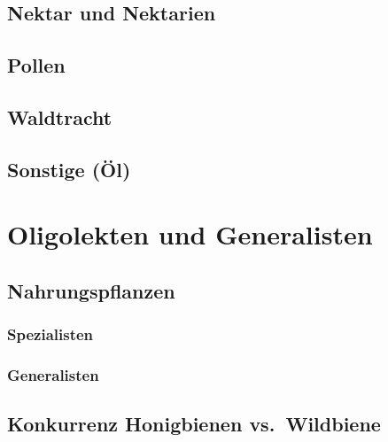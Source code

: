 \documentclass[
]{book}
\begin{document}
\hypertarget{nektar-und-nektarien}{%
\subsection{Nektar und Nektarien}\label{nektar-und-nektarien}}

\hypertarget{pollen}{%
\subsection{Pollen}\label{pollen}}

\hypertarget{waldtracht}{%
\subsection{Waldtracht}\label{waldtracht}}

\hypertarget{sonstige-uxf6l}{%
\subsection{Sonstige (Öl)}\label{sonstige-uxf6l}}

\hypertarget{oligolekten-und-generalisten}{%
\section{Oligolekten und Generalisten}\label{oligolekten-und-generalisten}}

\hypertarget{nahrungspflanzen}{%
\subsection{Nahrungspflanzen}\label{nahrungspflanzen}}

\hypertarget{spezialisten}{%
\subsubsection{Spezialisten}\label{spezialisten}}

\hypertarget{generalisten}{%
\subsubsection{Generalisten}\label{generalisten}}

\hypertarget{konkurrenz-honigbienen-vs.-wildbiene}{%
\subsection{Konkurrenz Honigbienen vs.~Wildbiene}\label{konkurrenz-honigbienen-vs.-wildbiene}}
\end{document}
